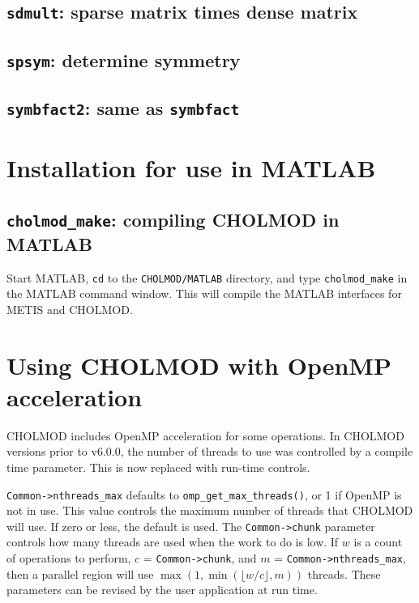 \documentclass[11pt]{article}
\begin{document}
\subsection{{\tt sdmult}: sparse matrix times dense matrix}


\subsection{{\tt spsym}: determine symmetry}


\subsection{{\tt symbfact2}: same as {\tt symbfact}}


\newpage \section{Installation for use in MATLAB}

\subsection{{\tt cholmod\_make}: compiling CHOLMOD in MATLAB}

Start MATLAB, {\tt cd} to the {\tt CHOLMOD/MATLAB} directory, and
type {\tt cholmod\_make} in the MATLAB command window.  This will compile
the MATLAB interfaces for METIS and CHOLMOD.

\section{Using CHOLMOD with OpenMP acceleration}

CHOLMOD includes OpenMP acceleration for some operations.  In CHOLMOD versions
prior to v6.0.0, the number of threads to use was controlled by a compile time
parameter.  This is now replaced with run-time controls.

\verb'Common->nthreads_max' defaults to \verb'omp_get_max_threads()', or 1 if
OpenMP is not in use.  This value controls the maximum number of threads that
CHOLMOD will use.  If zero or less, the default is used.  The
\verb'Common->chunk' parameter controls how many threads are used when the work
to do is low.  If $w$ is a count of operations to perform, $c$ =
\verb'Common->chunk', and $m$ = \verb'Common->nthreads_max', then a parallel
region will use $\max (1, \min (\lfloor w/c \rfloor, m))$ threads.  These
parameters can be revised by the user application at run time.
\end{document}
